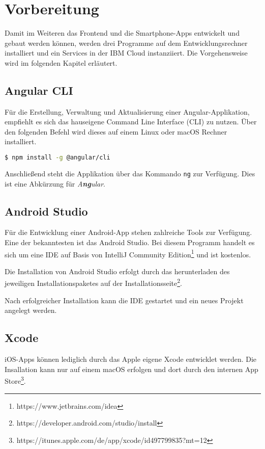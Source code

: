 \section{Vorbereitung}
Damit im Weiteren das Frontend und die Smartphone-Apps entwickelt und gebaut werden können, werden drei Programme auf
dem Entwicklungsrechner installiert und ein Services in der IBM Cloud instanziiert. Die Vorgehensweise wird im
folgenden Kapitel erläutert.

\subsection{Angular CLI}
Für die Erstellung, Verwaltung und Aktualisierung einer Angular-Applikation, empfiehlt es sich das hauseigene Command
Line Interface (CLI) zu nutzen. Über den folgenden Befehl wird dieses auf einem Linux oder macOS Rechner installiert.

\begin{lstlisting}[language=bash, caption=Installation des Angular CLI, label=ls:vorbereitung_angularcli]
    $ npm install -g @angular/cli
\end{lstlisting}

Anschließend steht die Applikation über das Kommando \texttt{ng} zur Verfügung. Dies ist eine Abkürzung für
\textit{A\textbf{ng}ular}.

\subsection{Android Studio}
Für die Entwicklung einer Android-App stehen zahlreiche Tools zur Verfügung. Eine der bekanntesten ist das Android
Studio. Bei diesem Programm handelt es sich um eine IDE auf Basis von IntelliJ Community
Edition\footnote{https://www.jetbrains.com/idea} und ist kostenlos.

Die Installation von Android Studio erfolgt durch das herunterladen des jeweiligen Installationspaketes auf der
Installationsseite\footnote{https://developer.android.com/studio/install}.

Nach erfolgreicher Installation kann die IDE gestartet und ein neues Projekt angelegt werden.

\subsection{Xcode}
iOS-Apps können lediglich durch das Apple eigene Xcode entwicklet werden. Die Insallation kann nur auf einem macOS
erfolgen und dort durch den internen App Store\footnote{https://itunes.apple.com/de/app/xcode/id497799835?mt=12}.

